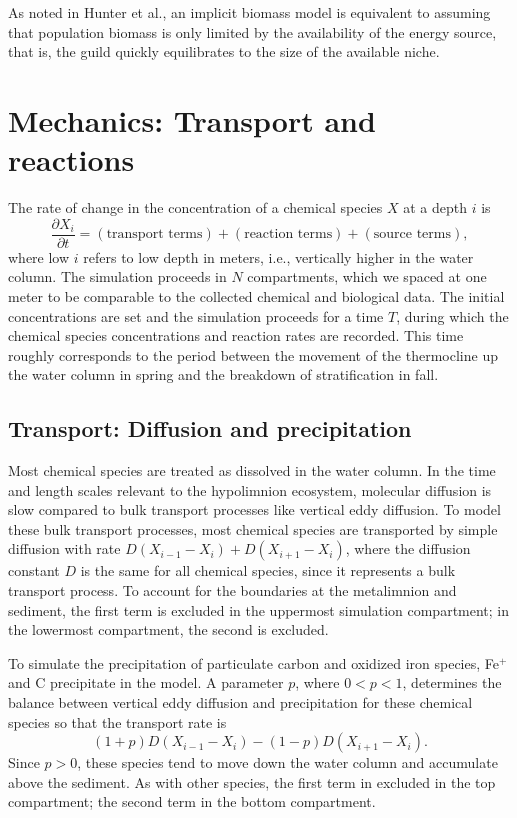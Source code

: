 \documentclass{report}
\begin{document}
As noted in Hunter et al.\cite{hunterkinetic1998}, an implicit biomass model is equivalent to assuming that population
biomass is only limited by the availability of the energy source, that is, the guild
quickly equilibrates to the size of the available niche.

\section{Mechanics: Transport and reactions}
The rate of change in the concentration of a chemical species $X$ at a depth $i$ is
\begin{equation}
  \frac{\partial X_i}{\partial t} = \left( \text{transport terms} \right) + \left(
  \text{reaction terms} \right) + \left(\text{source terms}\right),
\end{equation}
where low $i$ refers to low depth in meters, i.e., vertically higher in the water column.
The simulation proceeds in $N$ compartments, which we spaced at one meter to be comparable
to the collected chemical and biological data. The initial concentrations are set and the
simulation proceeds for a time $T$, during which the chemical species concentrations and
reaction rates are recorded. This time roughly corresponds to the period between the
movement of the thermocline up the water column in spring and the breakdown of
stratification in fall.

\subsection{Transport: Diffusion and precipitation}
Most chemical species are treated as dissolved in the water column. In the time and length
scales relevant to the hypolimnion ecosystem, molecular diffusion is slow compared to bulk
transport processes like vertical eddy diffusion. To model these bulk transport processes, most chemical species
are transported by
simple diffusion with rate $D \left(X_{i-1} - X_i\right) + D \left(X_{i+1} - X_i \right)$, where the diffusion
constant $D$ is the same for all chemical species, since it represents a bulk transport process. To account for the boundaries at the metalimnion and sediment, the first term is excluded in the uppermost simulation compartment; in the lowermost compartment, the second is excluded.

To simulate the precipitation of particulate carbon and oxidized iron species, Fe$^+$ and C precipitate in the model. A parameter $p$, where $0 < p < 1$,
determines the balance between vertical eddy diffusion and precipitation for these chemical species so that
the transport rate is
\begin{equation}
  (1 + p) D \left(X_{i-1} - X_i\right) - (1-p) D \left(X_{i+1} - X_i\right).
\end{equation}
Since $p > 0$, these species tend to move down the water column and accumulate above the sediment. As with other species, the first
term in excluded in the top compartment; the second term in the bottom compartment.
\end{document}
